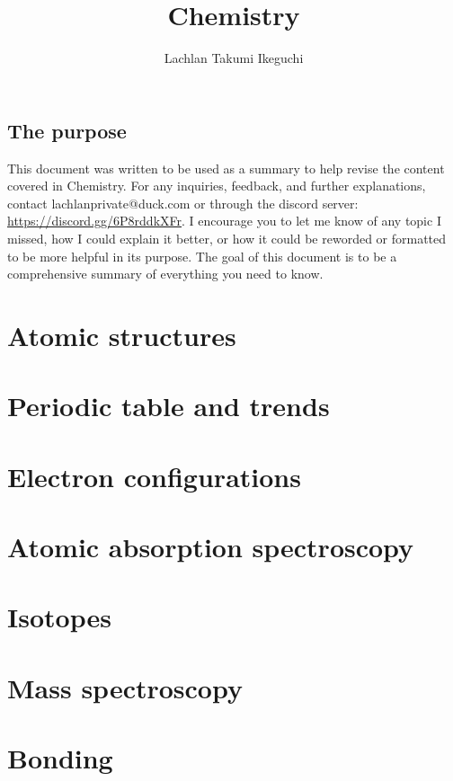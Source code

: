 \documentclass{book}
\title{Chemistry}
\author{Lachlan Takumi Ikeguchi}
\begin{document}
\maketitle
\tableofcontents

\section{The purpose}
This document was written to be used as a summary to help revise the content covered in Chemistry.  For any inquiries, feedback, and further explanations, contact lachlanprivate@duck.com or through the discord server: \url{https://discord.gg/6P8rddkXFr}.  I encourage you to let me know of any topic I missed, how I could explain it better, or how it could be reworded or formatted to be more helpful in its purpose.  The goal of this document is to be a comprehensive summary of everything you need to know.



\chapter{Atomic structures}

\chapter{Periodic table and trends}

\chapter{Electron configurations}

\chapter{Atomic absorption spectroscopy}

\chapter{Isotopes}

\chapter{Mass spectroscopy}

\chapter{Bonding}
\end{document}
